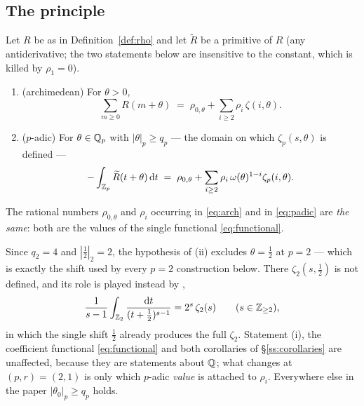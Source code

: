 \subsection{The principle}\label{ss:principle}

\begin{theorem}\label{thm:transfer}
\PROVED{} Let $R$ be as in Definition~\ref{def:rho} and let $\widetilde R$ be a primitive of
$R$ (any antiderivative; the two statements below are insensitive to the constant, which is
killed by $\rho_1=0$).
\begin{enumerate}[label=\textup{(\roman*)},leftmargin=2.6em]
\item \textup{(archimedean)} For $\theta>0$,
\begin{equation}\label{eq:arch}
 \sum_{m\ge0}R(m+\theta)\;=\;\rho_{0,\theta}+\sum_{i\ge2}\rho_i\,\zeta(i,\theta).
\end{equation}
\item \textup{($p$-adic)} For $\theta\in\mathbb{Q}_p$ with $|\theta|_p\ge q_p$ --- the domain on
which $\zeta_p(s,\theta)$ is defined \cite[\S2]{LaiSprang2023} ---
\begin{equation}\label{eq:padic}
 -\int_{\mathbb{Z}_p}\widetilde R(t+\theta)\,\mathrm{d} t
   \;=\;\rho_{0,\theta}+\sum_{i\ge2}\rho_i\,\omega(\theta)^{1-i}\zeta_p(i,\theta).
\end{equation}
\end{enumerate}
The rational numbers $\rho_{0,\theta}$ and $\rho_i$ occurring in \eqref{eq:arch} and in
\eqref{eq:padic} are \emph{the same}: both are the values of the single functional
\eqref{eq:functional}.
\end{theorem}

\begin{remark}[the excluded point $\theta=\tfrac12$, $p=2$]\label{rem:halfexcl}
Since $q_2=4$ and $|\tfrac12|_2=2$, the hypothesis of (ii) excludes $\theta=\tfrac12$ at
$p=2$ --- which is exactly the shift used by every $p=2$ construction below. There
$\zeta_2(s,\tfrac12)$ is not defined, and its role is played instead by
\cite[Lemma 9]{LSZ2025},
\[
 \frac1{s-1}\int_{\mathbb{Z}_2}\frac{\mathrm{d} t}{(t+\tfrac12)^{s-1}}=2^s\,\zeta_2(s)
 \qquad(s\in\mathbb{Z}_{\ge2}),
\]
in which the single shift $\tfrac12$ already produces the full $\zeta_2$. Statement (i),
the coefficient functional \eqref{eq:functional} and both corollaries of
\S\ref{ss:corollaries} are unaffected, because they are statements about $\mathbb{Q}$; what
changes at $(p,r)=(2,1)$ is only which $p$-adic \emph{value} is attached to $\rho_i$.
Everywhere else in the paper $|\theta_0|_p\ge q_p$ holds.
\end{remark}

